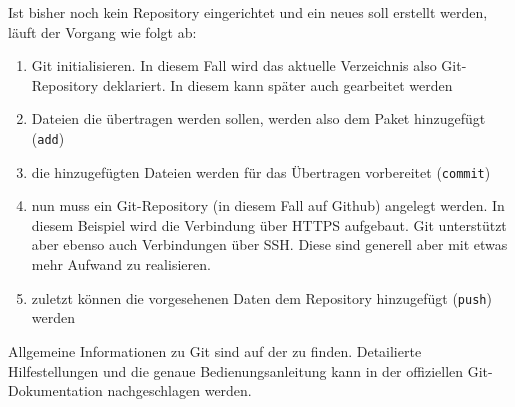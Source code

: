 Ist bisher noch kein Repository eingerichtet und ein neues soll erstellt werden, läuft der Vorgang wie folgt ab:

\begin{enumerate}

  \item Git initialisieren. In diesem Fall wird das aktuelle Verzeichnis also Git-Repository deklariert. In diesem kann später auch gearbeitet werden

	

  \item Dateien die übertragen werden sollen, werden also dem Paket hinzugefügt (\texttt{add})
  
  \item die hinzugefügten Dateien werden für das Übertragen vorbereitet (\texttt{commit})
  
  \item nun muss ein Git-Repository (in diesem Fall auf Github) angelegt werden. In diesem Beispiel wird die Verbindung über \gls{HTTPS} aufgebaut. Git unterstützt aber ebenso auch Verbindungen über SSH. Diese sind generell aber mit etwas mehr Aufwand zu realisieren.   
  
	

  
  \item zuletzt können die vorgesehenen Daten dem Repository hinzugefügt (\texttt{push}) werden 
  
   
\end{enumerate}   
   
Allgemeine Informationen zu Git sind auf der  zu finden. Detailierte Hilfestellungen und die genaue Bedienungsanleitung kann in der offiziellen Git-Dokumentation \cite{GitDoku} nachgeschlagen werden. 
   
